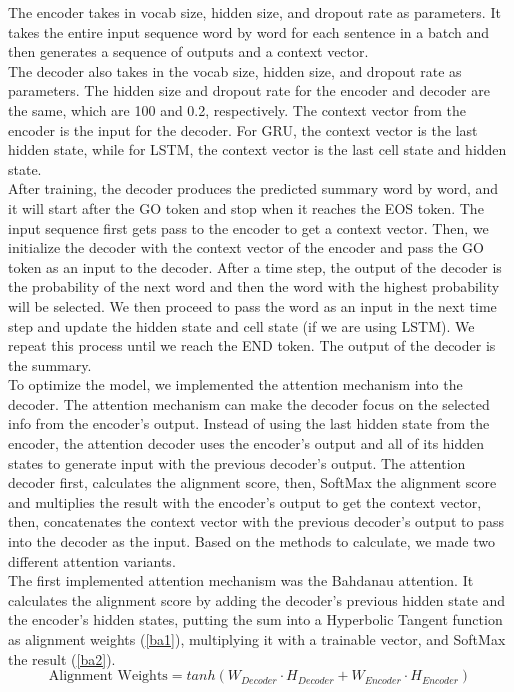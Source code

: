 \documentclass[conference]{IEEEtran}
\begin{document}
\indent The encoder takes in vocab size, hidden size, and dropout rate as parameters. It takes the entire input sequence word by word for each sentence in a batch and then generates a sequence of outputs and a context vector. \\
\indent The decoder also takes in the vocab size, hidden size, and dropout rate as parameters. The hidden size and dropout rate for the encoder and decoder are the same, which are 100 and 0.2, respectively. The context vector from the encoder is the input for the decoder. For GRU, the context vector is the last hidden state, while for LSTM, the context vector is the last cell state and hidden state. \\
\indent After training, the decoder produces the predicted summary word by word, and it will start after the GO token and stop when it reaches the EOS token. The input sequence first gets pass to the encoder to get a context vector. Then, we initialize the decoder with the context vector of the encoder and pass the GO token as an input to the decoder. After a time step, the output of the decoder is the probability of the next word and then the word with the highest probability will be selected. We then proceed to pass the word as an input in the next time step and update the hidden state and cell state (if we are using LSTM). We repeat this process until we reach the END token. The output of the decoder is the summary. \\
\indent To optimize the model, we implemented the attention mechanism into the decoder. The attention mechanism can make the decoder focus on the selected info from the encoder’s output. Instead of using the last hidden state from the encoder, the attention decoder uses the encoder’s output and all of its hidden states to generate input with the previous decoder’s output. The attention decoder first, calculates the alignment score, then, SoftMax the alignment score and multiplies the result with the encoder’s output to get the context vector, then, concatenates the context vector with the previous decoder’s output to pass into the decoder as the input. Based on the methods to calculate, we made two different attention variants. \\
\indent The first implemented attention mechanism was the Bahdanau attention. It calculates the alignment score by adding the decoder’s previous hidden state and the encoder’s hidden states, putting the sum into a Hyperbolic Tangent function as alignment weights (\ref{ba1}), multiplying it with a trainable vector, and SoftMax the result (\ref{ba2}).
\begin{dmath}
    \label{ba1}
    \text{Alignment Weights} = tanh(W_{Decoder} \cdot H_{Decoder} + W_{Encoder} \cdot H_{Encoder})
\end{dmath}  
\end{document}
